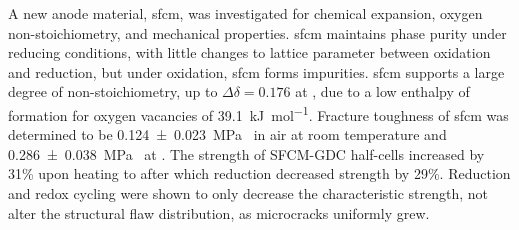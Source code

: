 A new anode material, \gls{sfcm}, was investigated for chemical expansion, oxygen non-stoichiometry, and mechanical properties.
\Gls{sfcm} maintains phase purity under reducing conditions, with little changes to lattice parameter between oxidation and reduction, but under oxidation, \gls{sfcm} forms  impurities.
\Gls{sfcm} supports a large degree of non-stoichiometry, up to $\Delta\delta = 0.176$  at , due to a low enthalpy of formation for oxygen vacancies of \SI{39.1}{\kilo\joule\per\mol}.
Fracture toughness of \gls{sfcm} was determined to be \SI[separate-uncertainty = true]{0.124 +- 0.023}{\mega\pascal{}} in air at room temperature and \SI[separate-uncertainty = true]{0.286 +- 0.038}{\mega\pascal{}} at .
The strength of SFCM-GDC half-cells increased by 31\% upon heating to  after which reduction decreased strength by 29\%.
Reduction and redox cycling were shown to only decrease the characteristic strength, not alter the structural flaw distribution, as microcracks uniformly grew.
